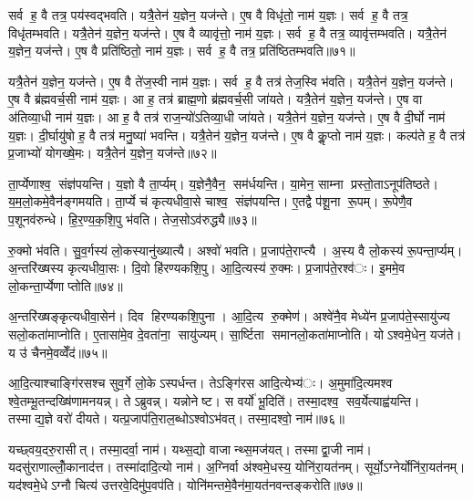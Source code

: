 सर्व ह॒ वै तत्र॒ पय॑स्वद्भवति। यत्रै॒तेन॑ य॒ज्ञेन॒ यज॑न्ते। ए॒ष वै विधृ॑तो॒ नाम॑ य॒ज्ञः। सर्व ह॒ वै तत्र॒ विधृ॑तम्भवति। यत्रै॒तेन॑ य॒ज्ञेन॒ यज॑न्ते। ए॒ष वै व्यावृ॑त्तो॒ नाम॑ य॒ज्ञः। सर्व ह॒ वै तत्र॒ व्यावृ॑त्तम्भवति। यत्रै॒तेन॑ य॒ज्ञेन॒ यज॑न्ते। ए॒ष वै प्रति॑ष्ठितो॒ नाम॑ य॒ज्ञः। सर्व ह॒ वै तत्र॒ प्रति॑ष्ठितम्भवति॥७१॥

यत्रै॒तेन॑ य॒ज्ञेन॒ यज॑न्ते। ए॒ष वै ते॑ज॒स्वी नाम॑ य॒ज्ञः। सर्व ह॒ वै तत्र॑ तेज॒स्वि भ॑वति। यत्रै॒तेन॑ य॒ज्ञेन॒ यज॑न्ते। ए॒ष वै ब्र॑ह्मवर्च॒सी नाम॑ य॒ज्ञः। आ ह॒ तत्र॑ ब्राह्म॒णो ब्र॑ह्मवर्च॒सी जा॑यते। यत्रै॒तेन॑ य॒ज्ञेन॒ यज॑न्ते। ए॒ष वा अ॑तिव्या॒धी नाम॑ य॒ज्ञः। आ ह॒ वै तत्र॑ राज॒न्यो॑ऽतिव्या॒धी जा॑यते। यत्रै॒तेन॑ य॒ज्ञेन॒ यज॑न्ते। ए॒ष वै दी॒र्घो नाम॑ य॒ज्ञः। दी॒र्घायु॑षो ह॒ वै तत्र॑ मनु॒ष्या॑ भवन्ति। यत्रै॒तेन॑ य॒ज्ञेन॒ यज॑न्ते। ए॒ष वै कॢ॒प्तो नाम॑ य॒ज्ञः। कल्प॑ते ह॒ वै तत्र॑ प्र॒जाभ्यो॑ योगख्षे॒मः। यत्रै॒तेन॑ य॒ज्ञेन॒ यज॑न्ते॥७२॥


ता॒र्प्येणाश्व॒ संज्ञ॑पयन्ति। य॒ज्ञो वै ता॒र्प्यम्। य॒ज्ञेनै॒वैन॒ सम॑र्धयन्ति। या॒मेन॒ साम्ना प्रस्तो॒ताऽनूप॑तिष्ठते। य॒म॒लो॒कमे॒वैन॑ङ्गमयति। ता॒र्प्ये च॑ कृत्यधीवा॒से चाश्व॒ संज्ञ॑पयन्ति। ए॒तद्वै प॑शू॒ना रू॒पम्। रू॒पेणै॒व प॒शूनव॑रुन्धे। हि॒र॒ण्य॒क॒शि॒पु भ॑वति। तेज॒सोऽव॑रुद्ध्यै॥७३॥

रु॒क्मो भ॑वति। सु॒व॒र्गस्य॑ लो॒कस्यानु॑ख्यात्यै। अश्वो॑ भवति। प्र॒जाप॑ते॒राप्त्यै। अ॒स्य वै लो॒कस्य॑ रू॒पन्ता॒र्प्यम्। अ॒न्तरि॑ख्षस्य कृत्यधीवा॒सः। दि॒वो हि॑रण्यकशि॒पु। आ॒दि॒त्यस्य॑ रु॒क्मः। प्र॒जाप॑ते॒रश्व॑ः। इ॒ममे॒व लो॒कन्ता॒र्प्येणाप्तोति॥७४॥

अ॒न्तरि॑ख्षङ्कृत्यधीवा॒सेन॑। दिव हिरण्यकशि॒पुना। आ॒दि॒त्य रु॒क्मेण॑। अश्वे॑नै॒व मेध्ये॑न प्र॒जाप॑ते॒स्सायु॑ज्य सलो॒कता॑माप्नोति। ए॒तासा॑मे॒व दे॒वता॑ना॒ सायु॑ज्यम्। सा॒र्ष्टिता समानलो॒कता॑माप्नोति। योऽश्वमे॒धेन॒ यज॑ते। य उ॑ चैनमे॒वव्वेँद॑॥७५॥


आ॒दि॒त्याश्चाङ्गि॑रसश्च सुव॒र्गे लो॒केऽस्पर्धन्त। तेऽङ्गि॑रस आदि॒त्येभ्य॑ः। अ॒मुमा॑दि॒त्यमश्व श्वे॒तम्भू॒तन्दख्षि॑णामनयन्न्। तेऽब्रुवन्न्। यन्नोनेष्ट। स वर्यो॑ भू॒दिति॑। तस्मा॒दश्व॒ सव॒र्येत्याह्व॑यन्ति। तस्माद्य॒ज्ञे वरो॑ दीयते। यत्प्र॒जाप॑ति॒राल॒ब्धोऽश्वोऽभ॑वत्। तस्मा॒दश्वो॒ नाम॑॥७६॥

यच्छ्वय॒दरु॒रासीत्। तस्मा॒दर्वा॒ नाम॑। यथ्स॒द्यो वाजान्थ्स॒मज॑यत्। तस्माद्वा॒जी नाम॑। यदसु॑राणाल्लोँ॒कानाद॑त्त। तस्मा॑दादि॒त्यो नाम॑। अ॒ग्निर्वा अ॑श्वमे॒धस्य॒ योनि॑रा॒यत॑नम्। सूर्यो॒ऽग्नेर्योनि॑रा॒यत॑नम्। यद॑श्वमे॒धेऽग्नौ चित्य॑ उत्तरवे॒दिमु॑प॒वप॑ति। योनि॑मन्तमे॒वैन॑मा॒यत॑नवन्तङ्करोति॥७७॥

